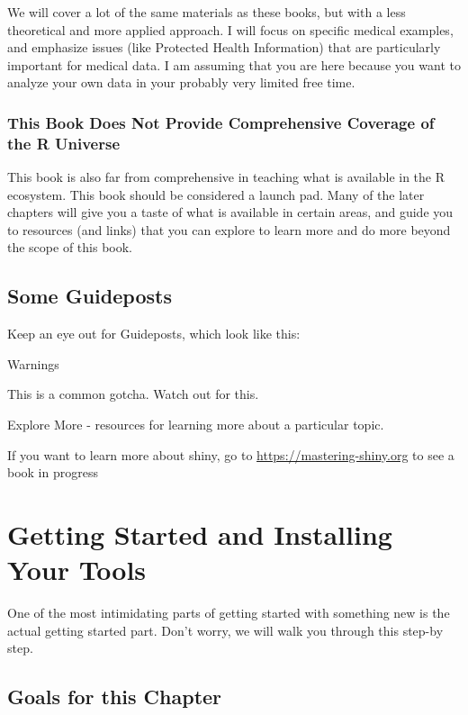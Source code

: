 \documentclass[]{book}
\begin{document}
We will cover a lot of the same materials as these books, but with a less theoretical and more applied approach. I will focus on specific medical examples, and emphasize issues (like Protected Health Information) that are particularly important for medical data. I am assuming that you are here because you want to analyze your own data in your probably very limited free time.

\hypertarget{this-book-does-not-provide-comprehensive-coverage-of-the-r-universe}{%
\subsection{This Book Does Not Provide Comprehensive Coverage of the R Universe}\label{this-book-does-not-provide-comprehensive-coverage-of-the-r-universe}}

This book is also far from comprehensive in teaching what is available in the R ecosystem. This book should be considered a launch pad. Many of the later chapters will give you a taste of what is available in certain areas, and guide you to resources (and links) that you can explore to learn more and do more beyond the scope of this book.

\hypertarget{some-guideposts}{%
\section{Some Guideposts}\label{some-guideposts}}

Keep an eye out for Guideposts, which look like this:

Warnings

This is a common gotcha. Watch out for this.

Explore More - resources for learning more about a particular topic.

If you want to learn more about shiny, go to \url{https://mastering-shiny.org} to see a book in progress

\hypertarget{getting-started-and-installing-your-tools}{%
\chapter{Getting Started and Installing Your Tools}\label{getting-started-and-installing-your-tools}}

One of the most intimidating parts of getting started with something new is the actual getting started part. Don't worry, we will walk you through this step-by step.

\hypertarget{goals-for-this-chapter}{%
\section{Goals for this Chapter}\label{goals-for-this-chapter}}
\end{document}

